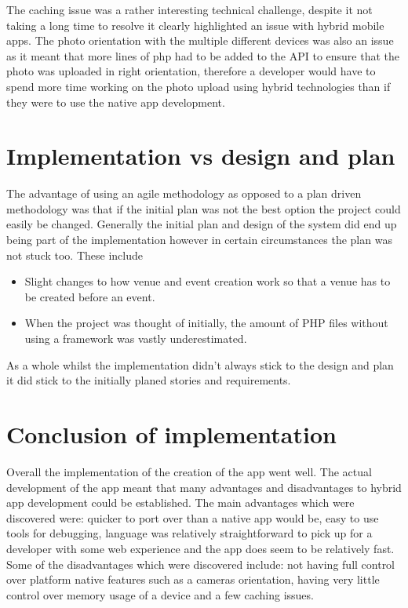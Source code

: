 The caching issue was a rather interesting technical challenge, despite it not taking a long time to resolve it clearly highlighted an issue with hybrid mobile apps. The photo orientation with the multiple different devices was also an issue as it meant that more lines of php had to be added to the API to ensure that the photo was uploaded in right orientation, therefore a developer would have to spend more time working on the photo upload using hybrid technologies than if they were to use the native app development.

\section{Implementation vs design and plan}
The advantage of using an agile methodology as opposed to a plan driven methodology was that if the initial plan was not the best option the project could easily be changed. Generally the initial plan and design of the system did end up being part of the implementation however in certain circumstances the plan was not stuck too. These include 
\begin{itemize}
  \item Slight changes to how venue and event creation work so that a venue has to be created before an event.
  \item When the project was thought of initially, the amount of PHP files without using a framework was vastly underestimated.
\end{itemize}
As a whole whilst the implementation didn't always stick to the design and plan it did stick to the initially planed stories and requirements.
\section{Conclusion of implementation}
Overall the implementation of the creation of the app went well. The actual development of the app meant that many advantages and disadvantages to hybrid app development could be established. The main advantages which were discovered were: quicker to port over than a native app would be, easy to use tools for debugging, language was relatively straightforward to pick up for a developer with some web experience and the app does seem to be relatively fast. Some of the disadvantages which were discovered include: not having full control over platform native features such as a cameras orientation, having very little control over memory usage of a device and a few caching issues.

